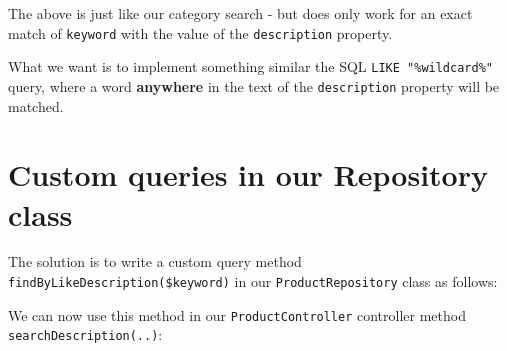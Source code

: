 \documentclass[a4paperpaper,openright]{book}
\newenvironment{Shaded}{}{}
\newcommand{\AnnotationTok}[1]{\textcolor[rgb]{0.38,0.63,0.69}{\textbf{\textit{#1}}}}
\newcommand{\CommentTok}[1]{\textcolor[rgb]{0.38,0.63,0.69}{\textit{#1}}}
\newcommand{\KeywordTok}[1]{\textcolor[rgb]{0.00,0.44,0.13}{\textbf{#1}}}
\newcommand{\NormalTok}[1]{#1}
\newcommand{\OtherTok}[1]{\textcolor[rgb]{0.00,0.44,0.13}{#1}}
\newcommand{\StringTok}[1]{\textcolor[rgb]{0.25,0.44,0.63}{#1}}
\begin{document}
The above is just like our category search - but does only work for an
exact match of \texttt{keyword} with the value of the
\texttt{description} property.

What we want is to implement something similar the SQL
\texttt{LIKE\ "\%wildcard\%"} query, where a word \textbf{anywhere} in
the text of the \texttt{description} property will be matched.

\hypertarget{custom-queries-in-our-repository-class}{%
\section{Custom queries in our Repository
class}\label{custom-queries-in-our-repository-class}}

The solution is to write a custom query method
\texttt{findByLikeDescription(\$keyword)} in our
\texttt{ProductRepository} class as follows:

\begin{Shaded}
\end{Shaded}

We can now use this method in our \texttt{ProductController} controller
method \texttt{searchDescription(..)}:
\end{document}

